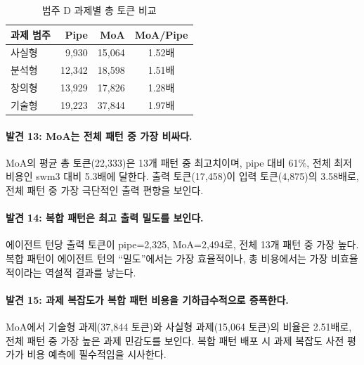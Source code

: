\documentclass[a4paper,11pt]{article}
\begin{document}
\begin{table}[H]
\centering
\caption{범주 D 과제별 총 토큰 비교}
\label{tab:cat-d-task}
{\small
\begin{tabular}{lrrc}
\toprule
과제 범주 & Pipe & MoA & MoA/Pipe \\
\midrule
사실형 & 9,930  & 15,064 & 1.52배 \\
분석형 & 12,342 & 18,598 & 1.51배 \\
창의형 & 13,929 & 17,826 & 1.28배 \\
기술형 & 19,223 & 37,844 & 1.97배 \\
\bottomrule
\end{tabular}
}
\end{table}

\paragraph{발견 13: MoA는 전체 패턴 중 가장 비싸다.}
MoA의 평균 총 토큰(22,333)은 13개 패턴 중 최고치이며, pipe 대비 61\%, 전체 최저 비용인 swm3 대비 5.3배에 달한다. 출력 토큰(17,458)이 입력 토큰(4,875)의 3.58배로, 전체 패턴 중 가장 극단적인 출력 편향을 보인다.

\paragraph{발견 14: 복합 패턴은 최고 출력 밀도를 보인다.}
에이전트 턴당 출력 토큰이 pipe=2,325, MoA=2,494로, 전체 13개 패턴 중 가장 높다. 복합 패턴이 에이전트 턴의 ``밀도''에서는 가장 효율적이나, 총 비용에서는 가장 비효율적이라는 역설적 결과를 낳는다.

\paragraph{발견 15: 과제 복잡도가 복합 패턴 비용을 기하급수적으로 증폭한다.}
MoA에서 기술형 과제(37,844 토큰)와 사실형 과제(15,064 토큰)의 비율은 2.51배로, 전체 패턴 중 가장 높은 과제 민감도를 보인다. 복합 패턴 배포 시 과제 복잡도 사전 평가가 비용 예측에 필수적임을 시사한다.
\end{document}
